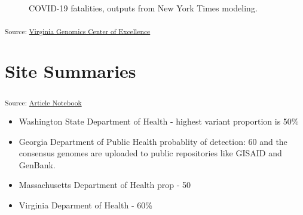 \documentclass[
  twocolumn]{article}
\providecommand{\tightlist}{%
  \setlength{\itemsep}{0pt}\setlength{\parskip}{0pt}}\usepackage{longtable,booktabs,array}
\begin{document}
\begin{figure}[H]


\caption{\label{fig-fatality-plot}COVID-19 fatalities, outputs from New
York Times modeling.}

\end{figure}%

\textsubscript{Source:
\href{https://coe-test-org.github.io/sitrep-demo/notebooks/vacoe-preview.html\#cell-fig-fatality-plot}{Virginia
Genomics Center of Excellence}}

\section{Site Summaries}\label{site-summaries}

\textsubscript{Source:
\href{https://coe-test-org.github.io/sitrep-demo/index.qmd.html}{Article
Notebook}}

\begin{itemize}
\tightlist
\item
  Washington State Department of Health - highest variant proportion is
  50\%
\item
  Georgia Department of Public Health probablity of detection: 60 and
  the consensus genomes are uploaded to public repositories like GISAID
  and GenBank.
\item
  Massachusetts Department of Health prop - 50
\item
  Virginia Deparment of Health - 60\%
\end{itemize}
\end{document}
